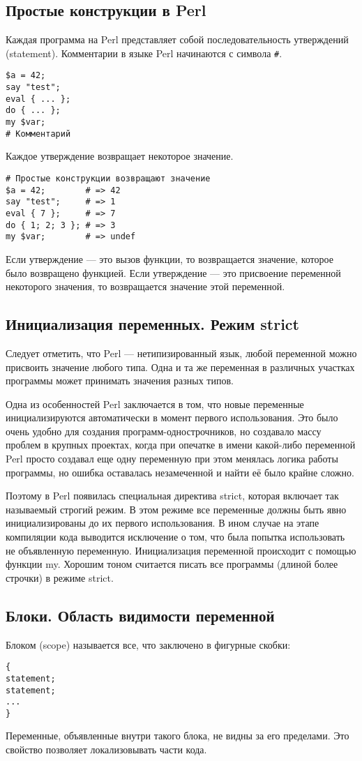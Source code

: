\subsection{Простые конструкции в Perl}
Каждая программа на Perl представляет собой последовательность утверждений (statement). Комментарии в языке Perl начинаются с символа \verb|#|.
\begin{verbatim}
$a = 42;
say "test";
eval { ... };
do { ... };
my $var;
# Комментарий
\end{verbatim}
Каждое утверждение возвращает некоторое значение.
\begin{verbatim}
# Простые конструкции возвращают значение
$a = 42;        # => 42
say "test";     # => 1
eval { 7 };     # => 7
do { 1; 2; 3 }; # => 3
my $var;        # => undef
\end{verbatim}
Если утверждение --- это вызов функции, то возвращается значение, которое было возвращено функцией. Если утверждение --- это присвоение переменной некоторого значения, то возвращается значение этой переменной.

\subsection{Инициализация переменных. Режим strict}
Следует отметить, что Perl --- нетипизированный язык, любой переменной можно присвоить значение любого типа. Одна и та же переменная в различных участках программы может принимать значения разных типов.

Одна из особенностей Perl заключается в том, что новые переменные инициализируются автоматически в момент первого использования. Это было очень удобно для создания программ-однострочников, но создавало массу проблем в крупных проектах, когда при опечатке в имени какой-либо переменной Perl просто создавал еще одну переменную при этом менялась логика работы программы, но ошибка оставалась незамеченной и найти её было крайне сложно.

Поэтому в Perl появилась специальная директива strict, которая включает так называемый строгий режим. В этом режиме все переменные должны быть явно инициализированы до их первого использования. В ином случае на этапе компиляции кода выводится исключение о том, что была попытка использовать не объявленную переменную. Инициализация переменной происходит с помощью функции my. Хорошим тоном считается писать все программы (длиной более строчки) в режиме strict.

\subsection{Блоки. Область видимости переменной}
Блоком (scope) называется все, что заключено в фигурные скобки:
\begin{verbatim}
{
statement;
statement;
...
}
\end{verbatim}
Переменные, объявленные внутри такого блока, не видны за его пределами. Это свойство позволяет локализовывать части кода.


